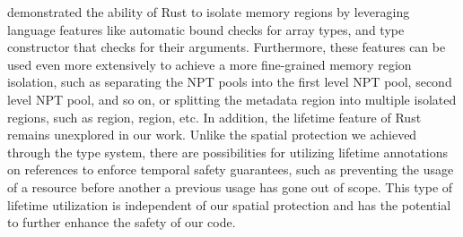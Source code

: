 \rustcore{} demonstrated the ability of Rust to isolate memory regions by
leveraging language features like automatic bound checks for array types, and
type constructor that checks for their arguments. Furthermore, these features
can be used even more extensively to achieve a more fine-grained memory region
isolation, such as separating the NPT pools into the first level NPT pool,
second level NPT pool, and so on, or splitting the \rustcore{} metadata region
into multiple isolated regions, such as  region, 
region, etc.
In addition, the lifetime feature of Rust remains unexplored in our work.
Unlike the spatial protection we achieved through the type system, there are
possibilities for utilizing lifetime annotations on references to enforce
temporal safety guarantees, such as preventing the usage of a resource before
another a previous usage has gone out of scope. This type of lifetime
utilization is independent of our spatial protection and has the potential to
further enhance the safety of our code.

%

